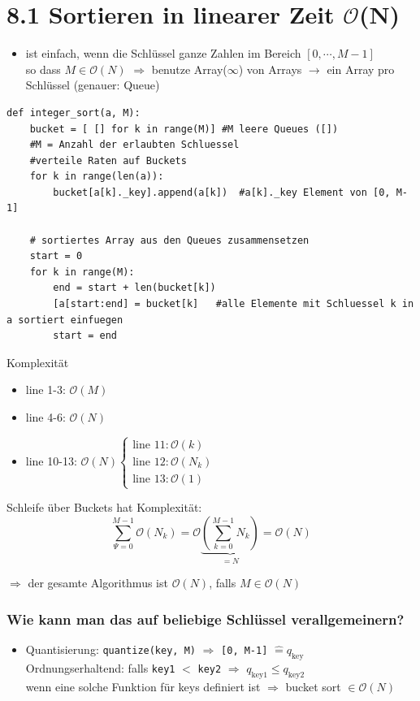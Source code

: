 \documentclass[11pt, fleqn]{scrreprt}
\newcommand{\bigO}[0]{\mathcal{O}}
\begin{document}
\section*{8.1 Sortieren in linearer Zeit $\bigO{}$(N)}
\begin{itemize}
    \item ist einfach, wenn die Schlüssel ganze Zahlen im Bereich $[0, \cdots, M-1]$ \\
    so dass $M \in \bigO{}(N)$ $\Rightarrow$ benutze Array($\infty$) von Arrays $\rightarrow$ ein Array pro Schlüssel (genauer: Queue)
\end{itemize}
\begin{verbatim}
def integer_sort(a, M):
    bucket = [ [] for k in range(M)] #M leere Queues ([])
    #M = Anzahl der erlaubten Schluessel
    #verteile Raten auf Buckets
    for k in range(len(a)):
        bucket[a[k]._key].append(a[k])  #a[k]._key Element von [0, M-1]

    # sortiertes Array aus den Queues zusammensetzen
    start = 0
    for k in range(M):
        end = start + len(bucket[k])
        [a[start:end] = bucket[k]   #alle Elemente mit Schluessel k in a sortiert einfuegen
        start = end
\end{verbatim}
Komplexität
\begin{itemize}
    \item line 1-3: $\bigO{}(M)$
    \item line 4-6: $\bigO{}(N)$
    \item line 10-13: $\bigO{}(N) \begin{cases} \text{line 11}: \bigO{}(k) \\ \text{line 12}: \bigO{}(N_k) \\ \text{line 13}: \bigO{}(1) \end{cases}$
\end{itemize}
Schleife über Buckets hat Komplexität: \[\sum_{\Psi = 0}^{M-1} \bigO{}(N_k) = \bigO{}\underbrace{\left(\sum_{k = 0}^{M-1}N_k\right)}_{=N} = \bigO{}(N)\]

$\Rightarrow$ der gesamte Algorithmus ist $\bigO{}(N)$, falls $M \in \bigO{}(N)$ \\

\subsubsection*{Wie kann man das auf beliebige Schlüssel verallgemeinern?}
\begin{itemize}
\item Quantisierung: \verb|quantize(key, M)| $\Rightarrow$ \verb|[0, M-1]| $\widehat{=} q_{\text{key}}$ \\
\hspace*{0.1cm} Ordnungserhaltend: falls \verb|key1| $<$ \verb|key2| $\Rightarrow$ $q_{\text{key1}} \leq q_{\text{key2}}$ \\
wenn eine solche Funktion für keys definiert ist $\Rightarrow$ bucket sort $\in \bigO{}(N)$
\end{itemize}
\end{document}
